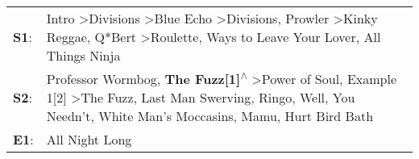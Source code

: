 \begin{supertabular}{p{0.03\textwidth}p{0.92\textwidth}}
 \textbf{S1}:  &                                           Intro\textsuperscript{} \textgreater \enspace Divisions\textsuperscript{} \textgreater \enspace Blue Echo\textsuperscript{} \textgreater \enspace Divisions\textsuperscript{}, \enspace Prowler\textsuperscript{} \textgreater \enspace Kinky Reggae\textsuperscript{}, \enspace Q*Bert\textsuperscript{} \textgreater \enspace Roulette\textsuperscript{},  Ways to Leave Your Lover\textsuperscript{}, \enspace All Things Ninja\textsuperscript{}  \enspace  \\
 \textbf{S2}:  &  Professor Wormbog\textsuperscript{}, \enspace \textbf{The Fuzz[1]\textsuperscript{$\wedge$}} \textgreater \enspace Power of Soul\textsuperscript{}, \enspace Example 1[2]\textsuperscript{} \textgreater \enspace The Fuzz\textsuperscript{}, \enspace Last Man Swerving\textsuperscript{}, \enspace Ringo\textsuperscript{}, \enspace Well, You Needn't\textsuperscript{}, \enspace White Man's Moccasins\textsuperscript{}, \enspace Mamu\textsuperscript{}, \enspace Hurt Bird Bath\textsuperscript{}  \enspace  \\
 \textbf{E1}:  &                                                                                                                                                                                                                                                                                                                                                                                                                                                                          All Night Long\textsuperscript{}  \enspace  \\
\end{supertabular}
